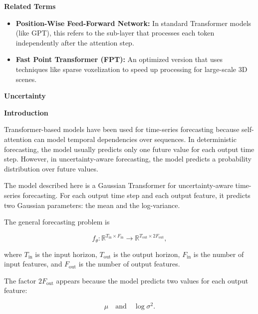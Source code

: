 \documentclass{book}
\providecommand{\ProjectDeepHeading}[2]{%
    \par\medskip\noindent\textbf{#2}\par\smallskip
}
\begin{document}
    \ProjectDeepHeading{10}{Related Terms}
        \begin{itemize}
            \item \textbf{Position-Wise Feed-Forward Network:} In standard Transformer models (like GPT), this refers to the sub-layer that processes each token independently after the attention step.
            \item \textbf{Fast Point Transformer (FPT):} An optimized version that uses techniques like sparse voxelization to speed up processing for large-scale 3D scenes.
        \end{itemize}

\ProjectDeepHeading{5}{Uncertainty}


\ProjectDeepHeading{8}{Introduction}
        
        Transformer-based models have been used for time-series forecasting because self-attention can model temporal dependencies over sequences. In deterministic forecasting, the model usually predicts only one future value for each output time step. However, in uncertainty-aware forecasting, the model predicts a probability distribution over future values.
        
        The model described here is a Gaussian Transformer for uncertainty-aware time-series forecasting. For each output time step and each output feature, it predicts two Gaussian parameters: the mean and the log-variance.
        
        The general forecasting problem is
        
        \[
            f_{\ensuremath{\theta}}:
            \mathbb{R}^{T_{\mathrm{in}} \times F_{\mathrm{in}}}
            \rightarrow
            \mathbb{R}^{T_{\mathrm{out}} \times 2F_{\mathrm{out}}},
        \]
        
        where \(T_{\mathrm{in}}\) is the input horizon, \(T_{\mathrm{out}}\) is the output horizon, \(F_{\mathrm{in}}\) is the number of input features, and \(F_{\mathrm{out}}\) is the number of output features.
        
        The factor \(2F_{\mathrm{out}}\) appears because the model predicts two values for each output feature:
        
        \[
            \ensuremath{\mu}
            \quad
            \text{and}
            \quad
            \log \ensuremath{\sigma}^2.
        \]
        
\end{document}
